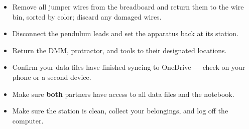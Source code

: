 \documentclass[
  12pt,
  letterpaper,
]{article}
\providecommand{\tightlist}{%
  \setlength{\itemsep}{0pt}\setlength{\parskip}{0pt}}
\begin{document}
\begin{itemize}
\tightlist
\item
  Remove all jumper wires from the breadboard and return them to the
  wire bin, sorted by color; discard any damaged wires.
\item
  Disconnect the pendulum leads and set the apparatus back at its
  station.
\item
  Return the DMM, protractor, and tools to their designated locations.
\item
  Confirm your data files have finished syncing to OneDrive --- check on
  your phone or a second device.
\item
  Make sure \textbf{both} partners have access to all data files and the
  notebook.
\item
  Make sure the station is clean, collect your belongings, and log off
  the computer.
\end{itemize}
\end{document}
